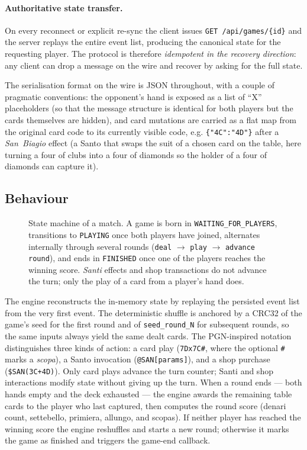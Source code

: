 \documentclass{scrartcl}
\newcommand{\figtikz}[2]{%
    \begin{figure}
        \centering
        \resizebox{\textwidth}{!}{}
        \caption{#2}
        \label{fig:#1}
    \end{figure}%
}
\begin{document}
\paragraph{Authoritative state transfer.} On every reconnect or
explicit re-sync the client issues \texttt{GET /api/games/\{id\}} and
the server replays the entire event list, producing the canonical
state for the requesting player. The protocol is therefore
\emph{idempotent in the recovery direction}: any client can drop a
message on the wire and recover by asking for the full state.

The serialisation format on the wire is JSON throughout, with a couple
of pragmatic conventions: the opponent's hand is exposed as a list of
``X'' placeholders (so that the message structure is identical for
both players but the cards themselves are hidden), and card mutations
are carried as a flat map from the original card code to its currently
visible code, e.g. \texttt{\{"4C":"4D"\}} after a \emph{San~Biagio}
effect (a Santo that swaps the suit of a chosen card on the table,
here turning a four of clubs into a four of diamonds so the holder of
a four of diamonds can capture it).

\subsection{Behaviour}\label{behaviour}

\figtikz{state-match}{State machine of a match. A game is born in
\texttt{WAITING\_FOR\_PLAYERS}, transitions to \texttt{PLAYING} once
both players have joined, alternates internally through several rounds
(\texttt{deal} $\to$ \texttt{play} $\to$ \texttt{advance round}), and
ends in \texttt{FINISHED} once one of the players reaches the winning
score. \emph{Santi} effects and shop transactions do not advance the
turn; only the play of a card from a player's hand does.}

The engine reconstructs the in-memory state by replaying the
persisted event list from the very first event. The deterministic
shuffle is anchored by a CRC32 of the game's seed for the first round
and of \texttt{seed\_round\_N} for subsequent rounds, so the same
inputs always yield the same dealt cards. The
PGN-inspired notation distinguishes three kinds of action: a card
play (\texttt{7Dx7C\#}, where the optional \texttt{\#} marks a
\emph{scopa}), a Santo invocation (\texttt{@SAN[params]}), and a shop
purchase (\texttt{\$SAN(3C+4D)}). Only card plays advance the turn
counter; Santi and shop interactions modify state without giving up the
turn. When a round ends --- both hands empty and the deck exhausted ---
the engine awards the remaining table cards to the player who last
captured, then computes the round score (denari count, settebello,
primiera, allungo, and scopas). If neither player has reached the
winning score the engine reshuffles and starts a new round; otherwise
it marks the game as finished and triggers the game-end callback.
\end{document}
